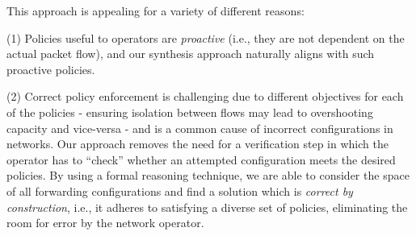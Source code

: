 This approach is appealing for a variety of different reasons: 

(1)
Policies useful to operators are \emph{proactive} (i.e., they are not
dependent on the actual packet flow), and our synthesis approach
naturally aligns with such proactive policies.


(2) Correct policy enforcement is challenging due to different
objectives for each of the policies - ensuring isolation between flows
may lead to overshooting capacity and vice-versa - and is a common
cause of incorrect configurations in networks.  Our approach removes
the need for a verification step in which the operator has to
``check'' whether an attempted configuration meets the desired
policies.  By using a formal reasoning technique, we are able to
consider the space of all forwarding configurations and find a
solution which is \emph{correct by construction}, i.e., it adheres to
satisfying a diverse set of policies, eliminating the room for error
by the network operator.

